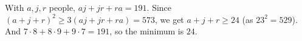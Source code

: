 With $a,j,r$ people, $aj+jr+ra=191$. Since $(a+j+r)^2\ge3(aj+jr+ra)=573$, we get $a+j+r\ge24$ (as $23^2=529$). And $7\cdot8+8\cdot9+9\cdot7=191$, so the minimum is $\boxed{24}$.
